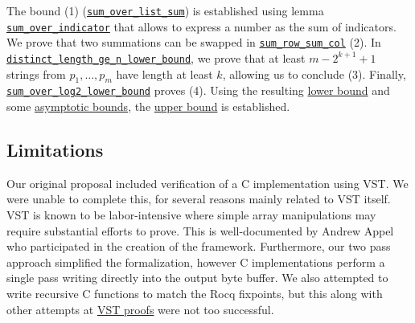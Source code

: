 \documentclass[
  a4paper, twocolumn, DIV=calc]{scrartcl}
\begin{document}
The bound (1)
(\href{https://github.com/Jatana/LZ78FormalVerification/blob/2819b54b6eb88639461c4fd3504fbc2a87e8cbc0/lz78/LZ.v#L903}{\texttt{sum\_over\_list\_sum}})
is established using lemma
\href{https://github.com/Jatana/LZ78FormalVerification/blob/2819b54b6eb88639461c4fd3504fbc2a87e8cbc0/lz78/LZ.v#L883C9-L883C27}{\texttt{sum\_over\_indicator}}
that allows to express a number as the sum of indicators. We prove that two
summations can be swapped in
\href{https://github.com/Jatana/LZ78FormalVerification/blob/2819b54b6eb88639461c4fd3504fbc2a87e8cbc0/lz78/LZ.v#L833}{\texttt{sum\_row\_sum\_col}}
(2). In
\href{https://github.com/Jatana/LZ78FormalVerification/blob/2819b54b6eb88639461c4fd3504fbc2a87e8cbc0/lz78/LZ.v#L736}{\texttt{distinct\_length\_ge\_n\_lower\_bound}},
we prove that at least $m - 2^{k+1} + 1$ strings from $p_1, \ldots, p_m$ have
length at least $k$, allowing us to conclude (3).
Finally,
\href{https://github.com/Jatana/LZ78FormalVerification/blob/2819b54b6eb88639461c4fd3504fbc2a87e8cbc0/lz78/LZ.v#L1046}{\texttt{sum\_over\_log2\_lower\_bound}}
proves (4).
Using the resulting \href{https://github.com/Jatana/LZ78FormalVerification/blob/2819b54b6eb88639461c4fd3504fbc2a87e8cbc0/lz78/LZ.v#L1077}{lower bound} and some
\href{https://github.com/Jatana/LZ78FormalVerification/blob/2819b54b6eb88639461c4fd3504fbc2a87e8cbc0/lz78/LZ.v#L1383}{asymptotic bounds},
the \href{https://github.com/Jatana/LZ78FormalVerification/blob/2819b54b6eb88639461c4fd3504fbc2a87e8cbc0/lz78/LZ.v#L1469}{upper bound} is established.


\subsection{Limitations}
Our original proposal included verification of a C implementation using
VST. We were unable to complete this, for several reasons mainly related to VST
itself. VST is known to be labor-intensive where simple array manipulations may
require substantial efforts to prove. This is well-documented by Andrew Appel
\cite[16]{VSTSHA} who participated in the creation of the framework.
Furthermore, our two pass approach simplified the formalization, however C
implementations perform a single pass writing directly into the output byte
buffer.
We also attempted to write recursive C functions to match the Rocq fixpoints,
but this along with other attempts at
\href{https://github.com/Jatana/LZ78FormalVerification/blob/a4188da3bfc59da321dffea4d105660a756dabc1/lz77/verif_LZC.v}{VST proofs}
were not too successful. 
\end{document}
